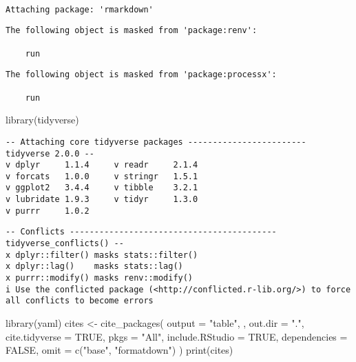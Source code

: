 \documentclass[
  letterpaper,
  DIV=11,
  numbers=noendperiod]{scrartcl}
\newenvironment{Shaded}{\begin{snugshade}}{\end{snugshade}}
\newcommand{\AttributeTok}[1]{\textcolor[rgb]{0.40,0.45,0.13}{#1}}
\newcommand{\ConstantTok}[1]{\textcolor[rgb]{0.56,0.35,0.01}{#1}}
\newcommand{\FunctionTok}[1]{\textcolor[rgb]{0.28,0.35,0.67}{#1}}
\newcommand{\NormalTok}[1]{\textcolor[rgb]{0.00,0.23,0.31}{#1}}
\newcommand{\OtherTok}[1]{\textcolor[rgb]{0.00,0.23,0.31}{#1}}
\newcommand{\StringTok}[1]{\textcolor[rgb]{0.13,0.47,0.30}{#1}}
\begin{document}
\begin{verbatim}

Attaching package: 'rmarkdown'
\end{verbatim}

\begin{verbatim}
The following object is masked from 'package:renv':

    run
\end{verbatim}

\begin{verbatim}
The following object is masked from 'package:processx':

    run
\end{verbatim}

\begin{Shaded}
\begin{Highlighting}[]
\FunctionTok{library}\NormalTok{(tidyverse)}
\end{Highlighting}
\end{Shaded}

\begin{verbatim}
-- Attaching core tidyverse packages ------------------------ tidyverse 2.0.0 --
v dplyr     1.1.4     v readr     2.1.4
v forcats   1.0.0     v stringr   1.5.1
v ggplot2   3.4.4     v tibble    3.2.1
v lubridate 1.9.3     v tidyr     1.3.0
v purrr     1.0.2     
\end{verbatim}

\begin{verbatim}
-- Conflicts ------------------------------------------ tidyverse_conflicts() --
x dplyr::filter() masks stats::filter()
x dplyr::lag()    masks stats::lag()
x purrr::modify() masks renv::modify()
i Use the conflicted package (<http://conflicted.r-lib.org/>) to force all conflicts to become errors
\end{verbatim}

\begin{Shaded}
\begin{Highlighting}[]
\FunctionTok{library}\NormalTok{(yaml)}
\NormalTok{cites }\OtherTok{\textless{}{-}} \FunctionTok{cite\_packages}\NormalTok{(}
    \AttributeTok{output =} \StringTok{"table"}\NormalTok{, ,}
    \AttributeTok{out.dir =} \StringTok{"."}\NormalTok{,}
    \AttributeTok{cite.tidyverse =} \ConstantTok{TRUE}\NormalTok{,}
    \AttributeTok{pkgs =} \StringTok{"All"}\NormalTok{,}
    \AttributeTok{include.RStudio =} \ConstantTok{TRUE}\NormalTok{,}
    \AttributeTok{dependencies =} \ConstantTok{FALSE}\NormalTok{,}
    \AttributeTok{omit =} \FunctionTok{c}\NormalTok{(}\StringTok{"base"}\NormalTok{, }\StringTok{"formatdown"}\NormalTok{)}
\NormalTok{)}
\FunctionTok{print}\NormalTok{(cites)}
\end{Highlighting}
\end{Shaded}
\end{document}
